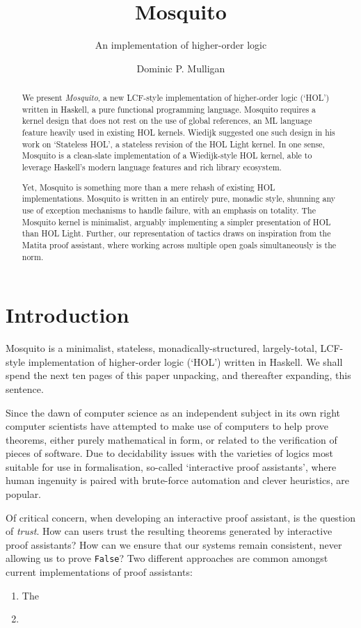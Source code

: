 \documentclass{llncs}
\author{Dominic P. Mulligan}
\title{Mosquito}
\subtitle{An implementation of higher-order logic}
\institute{Computer Laboratory, University of Cambridge}
\begin{document}
\maketitle

\begin{abstract}
We present \emph{Mosquito}, a new LCF-style implementation of higher-order logic (`HOL') written in Haskell, a pure functional programming language.
Mosquito requires a kernel design that does not rest on the use of global references, an ML language feature heavily used in existing HOL kernels.
Wiedijk suggested one such design in his work on `Stateless HOL', a stateless revision of the HOL Light kernel.
In one sense, Mosquito is a clean-slate implementation of a Wiedijk-style HOL kernel, able to leverage Haskell's modern language features and rich library ecosystem.

Yet, Mosquito is something more than a mere rehash of existing HOL implementations.
Mosquito is written in an entirely pure, monadic style, shunning any use of exception mechanisms to handle failure, with an emphasis on totality.
The Mosquito kernel is minimalist, arguably implementing a simpler presentation of HOL than HOL Light.
Further, our representation of tactics draws on inspiration from the Matita proof assistant, where working across multiple open goals simultaneously is the norm.
\end{abstract}

\section{Introduction}
\label{sect.introduction}

Mosquito is a minimalist, stateless, monadically-structured, largely-total, LCF-style implementation of higher-order logic (`HOL') written in Haskell.
We shall spend the next ten pages of this paper unpacking, and thereafter expanding, this sentence.

Since the dawn of computer science as an independent subject in its own right computer scientists have attempted to make use of computers to help prove theorems, either purely mathematical in form, or related to the verification of pieces of software.
Due to decidability issues with the varieties of logics most suitable for use in formalisation, so-called `interactive proof assistants', where human ingenuity is paired with brute-force automation and clever heuristics, are popular.

Of critical concern, when developing an interactive proof assistant, is the question of \emph{trust}.
How can users trust the resulting theorems generated by interactive proof assistants?
How can we ensure that our systems remain consistent, never allowing us to prove \texttt{False}?
Two different approaches are common amongst current implementations of proof assistants:
\begin{enumerate}
\item
The 
\item
\end{enumerate}
\end{document}
